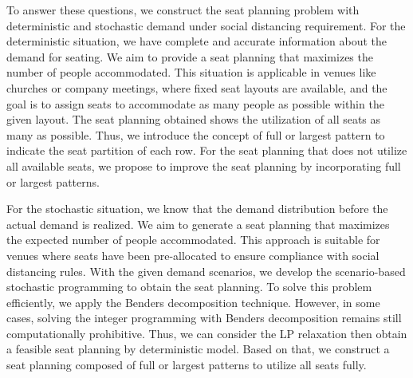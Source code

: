 To answer these questions, we construct the seat planning problem with deterministic and stochastic demand under social distancing requirement. For the deterministic situation, we have complete and accurate information about the demand for seating. We aim to provide a seat planning that maximizes the number of people accommodated. This situation is applicable in venues like churches or company meetings, where fixed seat layouts are available, and the goal is to assign seats to accommodate as many people as possible within the given layout. The seat planning obtained shows the utilization of all seats as many as possible. Thus, we introduce the concept of full or largest pattern to indicate the seat partition of each row. For the seat planning that does not utilize all available seats, we propose to improve the seat planning by incorporating full or largest patterns.

For the stochastic situation, we know that the demand distribution before the actual demand is realized. We aim to generate a seat planning that maximizes the expected number of people accommodated. This approach is suitable for venues where seats have been pre-allocated to ensure compliance with social distancing rules. With the given demand scenarios, we develop the scenario-based stochastic programming to obtain the seat planning. To solve this problem efficiently, we apply the Benders decomposition technique. However, in some cases, solving the integer programming with Benders decomposition remains still computationally prohibitive. Thus, we can consider the LP relaxation then obtain a feasible seat planning by deterministic model. Based on that, we construct a seat planning composed of full or largest patterns to utilize all seats fully.

